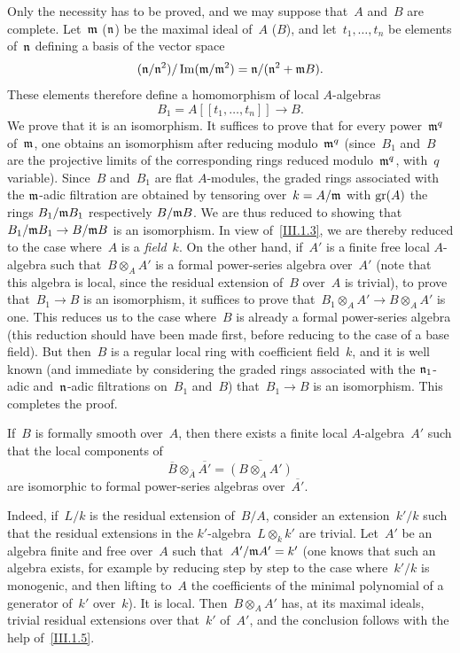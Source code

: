 Only the necessity has to be proved, and we may suppose that~$A$ and~$B$ are complete. Let~$\mathfrak{m}$ ($\mathfrak{n}$) be the maximal ideal of~$A$ ($B$), and let~$t_1,\dots,t_n$ be elements of~$\mathfrak{n}$ defining a basis of the vector space
\[
(\mathfrak{n}/\mathfrak{n}^2)/\operatorname{Im}(\mathfrak{m}/\mathfrak{m}^2)=\mathfrak{n}/(\mathfrak{n}^2+\mathfrak{m}B).
\]
These elements therefore define a homomorphism of local $A$-algebras
\[
B_1=A[[t_1,\dots,t_n]]\to B.
\]
We prove that it is an isomorphism. It suffices to prove that for every power~$\mathfrak{m}^q$ of~$\mathfrak{m}$, one obtains an isomorphism after reducing modulo~$\mathfrak{m}^q$ (since~$B_1$ and~$B$ are the projective limits of the corresponding rings reduced modulo~$\mathfrak{m}^q$, with~$q$ variable). Since~$B$ and~$B_1$ are flat $A$-modules, the graded rings associated with the $\mathfrak{m}$-adic filtration are obtained by tensoring over~$k=A/\mathfrak{m}$ with $\operatorname{gr}(A)$ the rings $B_1/\mathfrak{m}B_1$ respectively $B/\mathfrak{m}B$. We are thus reduced to showing that $B_1/\goth{m}B_1\to B/\goth{m}B$ is an isomorphism. In view of~\ref{III.1.3}, we are thereby reduced to the case where~$A$ is a \emph{field}~$k$. On the other hand, if~$A'$ is a finite free local $A$-algebra such that~$B\otimes_A A'$ is a formal power-series algebra over~$A'$ (note that this algebra is local, since the residual extension of~$B$ over~$A$ is trivial), to prove that~$B_1\to B$ is an isomorphism, it suffices to prove that~$B_1\otimes_A A'\to B\otimes_A A'$ is one. This reduces us to the case where~$B$ is already a formal power-series algebra (this reduction should have been made first, before reducing to the case of a base field). But then~$B$ is a regular local ring with coefficient field~$k$, and it is well known (and immediate by considering the graded rings associated with the $\mathfrak{n}_1$-adic and~$\mathfrak{n}$-adic filtrations on~$B_1$ and~$B$) that~$B_1\to B$ is an isomorphism. This completes the proof.

\begin{corollary}
\label{III.1.6}
If~$B$ is formally smooth over~$A$, then there exists a finite local $A$-algebra~$A'$ such that the local components of
\[
\overline{B}\otimes_{\overline{A}}\overline{A'}=\overline{(B\otimes_A A')}
\]
are isomorphic to formal power-series algebras over~$\overline{A'}$.
\end{corollary}
Indeed, if~$L/k$ is the residual extension of~$B/A$, consider an extension~$k'/k$ such that the residual extensions in the $k'$-algebra~$L\otimes_k k'$ are trivial. Let~$A'$ be an algebra finite and free over~$A$ such that~$A'/\mathfrak{m}A'=k'$ (one knows that such an algebra exists, for example by reducing step by step to the case where~$k'/k$ is monogenic, and then lifting to~$A$ the coefficients of the minimal polynomial of a generator of~$k'$ over~$k$). It is local. Then~$B\otimes_A A'$ has, at its maximal ideals, trivial residual extensions over that~$k'$ of~$A'$, and the conclusion follows with the help of~\ref{III.1.5}.

